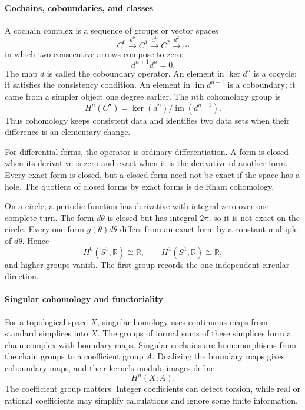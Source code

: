 \paragraph{Cochains, coboundaries, and classes}

A cochain complex is a sequence of groups or vector spaces
\[
 C^0\xrightarrow{d^0}C^1\xrightarrow{d^1}C^2\xrightarrow{d^2}\cdots
\]
in which two consecutive arrows compose to zero:
\[
 d^{n+1}d^n=0.
\]
The map $d$ is called the coboundary operator. An element in $\ker d^n$ is a cocycle; it satisfies the consistency condition. An element in $\operatorname{im}d^{n-1}$ is a coboundary; it came from a simpler object one degree earlier. The $n$th cohomology group is
\[
 H^n(C^\bullet)=\ker(d^n)/\operatorname{im}(d^{n-1}).
\]
Thus cohomology keeps consistent data and identifies two data sets when their difference is an elementary change.

For differential forms, the operator is ordinary differentiation. A form is closed when its derivative is zero and exact when it is the derivative of another form. Every exact form is closed, but a closed form need not be exact if the space has a hole. The quotient of closed forms by exact forms is de Rham cohomology.

On a circle, a periodic function has derivative with integral zero over one complete turn. The form $d\theta$ is closed but has integral $2\pi$, so it is not exact on the circle. Every one-form $g(\theta)d\theta$ differs from an exact form by a constant multiple of $d\theta$. Hence
\[
 H^0(S^1,\mathbb R)\cong\mathbb R,\qquad
 H^1(S^1,\mathbb R)\cong\mathbb R,
\]
and higher groups vanish. The first group records the one independent circular direction. \cite{cohomology_theory_ref2,cohomology_theory_ref3}

\paragraph{Singular cohomology and functoriality}

For a topological space $X$, singular homology uses continuous maps from standard simplices into $X$. The groups of formal sums of these simplices form a chain complex with boundary maps. Singular cochains are homomorphisms from the chain groups to a coefficient group $A$. Dualizing the boundary maps gives coboundary maps, and their kernels modulo images define
\[
 H^n(X;A).
\]
The coefficient group matters. Integer coefficients can detect torsion, while real or rational coefficients may simplify calculations and ignore some finite information.

